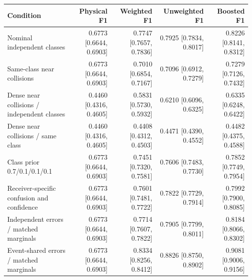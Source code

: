 \begin{tabularx}{\linewidth}{@{}Yrrrr@{}}\toprule
Condition & Physical F1 & Weighted F1 & Unweighted F1 & Boosted F1 \\\midrule
Nominal independent classes & 0.6773 [0.6644, 0.6903] & 0.7747 [0.7657, 0.7836] & 0.7925 [0.7834, 0.8017] & 0.8226 [0.8141, 0.8312] \\
Same-class near collisions & 0.6773 [0.6644, 0.6903] & 0.7010 [0.6854, 0.7167] & 0.7096 [0.6912, 0.7279] & 0.7279 [0.7126, 0.7432] \\
Dense near collisions / independent classes & 0.4460 [0.4316, 0.4605] & 0.5831 [0.5730, 0.5932] & 0.6210 [0.6096, 0.6325] & 0.6335 [0.6248, 0.6422] \\
Dense near collisions / same class & 0.4460 [0.4316, 0.4605] & 0.4408 [0.4312, 0.4503] & 0.4471 [0.4390, 0.4552] & 0.4482 [0.4375, 0.4588] \\
Class prior 0.7/0.1/0.1/0.1 & 0.6773 [0.6644, 0.6903] & 0.7451 [0.7320, 0.7581] & 0.7606 [0.7483, 0.7730] & 0.7852 [0.7749, 0.7954] \\
Receiver-specific confusion and confidence & 0.6773 [0.6644, 0.6903] & 0.7601 [0.7481, 0.7722] & 0.7822 [0.7729, 0.7914] & 0.7992 [0.7900, 0.8085] \\
Independent errors / matched marginals & 0.6773 [0.6644, 0.6903] & 0.7714 [0.7607, 0.7822] & 0.7905 [0.7799, 0.8011] & 0.8184 [0.8066, 0.8302] \\
Event-shared errors / matched marginals & 0.6773 [0.6644, 0.6903] & 0.8334 [0.8256, 0.8412] & 0.8826 [0.8750, 0.8902] & 0.9081 [0.9006, 0.9156] \\
\bottomrule\end{tabularx}
